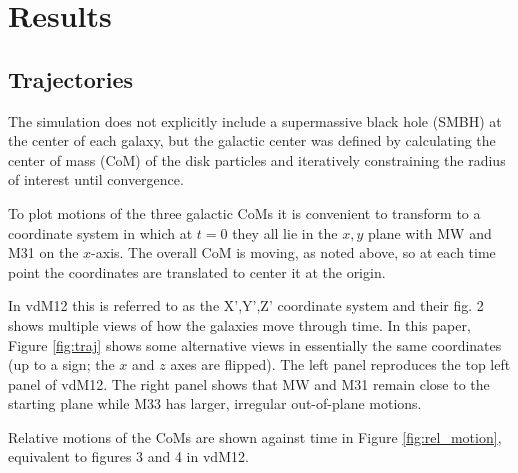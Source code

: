 \documentclass[twocolumn]{aastex63}
\begin{document}
\section{Results}

\begin{figure*}[htb!]
	\caption{Trajectories of each galactic center of mass in (left plot) and perpendicular (right plot) to the X',Y' plane. Points are at 71 Myr intervals.
		\label{fig:traj}}
\end{figure*}

\begin{figure*}[bth]
	\caption{Separations (left plot) and relative velocities (right plot) of galactic CoMs.
		\label{fig:rel_motion}}
\end{figure*}

\subsection{Trajectories}

The simulation does not explicitly include a supermassive black hole (SMBH) at the center of each galaxy, but the galactic center was defined by calculating the center of mass (CoM) of the disk particles and iteratively constraining the radius of interest until convergence.

To plot motions of the three galactic CoMs it is convenient to transform to a coordinate system in which at $t=0$ they all lie in the $x,y$ plane with MW and M31 on the $x$-axis. The overall CoM is moving, as noted above, so at each time point the coordinates are translated to center it at the origin.

In vdM12 this is referred to as the X',Y',Z' coordinate system and their fig. 2 shows multiple views of how the galaxies move through time. In this paper, Figure \ref{fig:traj} shows some alternative views in essentially the same coordinates (up to a sign; the $x$ and $z$ axes are flipped). The left panel reproduces the top left panel of vdM12. The right panel shows that MW and M31 remain close to the starting plane while M33 has larger, irregular out-of-plane motions.

Relative motions of the CoMs are shown against time in Figure \ref{fig:rel_motion}, equivalent to figures 3 and 4 in vdM12.


\begin{figure*}[ht!]
	\caption{Mass profiles for each galaxy at the current epoch.
		\label{fig:massprof0}}
\end{figure*}
\end{document}
